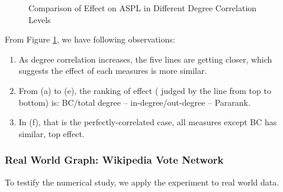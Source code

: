\documentclass{article}
\begin{document}
\begin{enumerate}
\begin{figure}[!hbtp]
\hfill
{}
\hfill
{}
\hfill
\caption{
\label{comps}%
Comparison of Effect on ASPL in Different Degree Correlation Levels}
\end{figure}

From Figure \ref{comps}, we have following observations:
\begin{enumerate}
\item As degree correlation increases, the five lines are getting closer, which suggests the effect of each measures is more similar.
\item From (a) to (e), the ranking of effect ( judged by the line from top to bottom) is: BC/total degree -- in-degree/out-degree -- Pararank.
\item In (f), that is the perfectly-correlated case, all measures except BC has similar, top effect.
\end{enumerate}

\end{enumerate}

\subsubsection{Real World Graph: Wikipedia Vote Network}
\par To testify the numerical study, we apply the experiment to real world data. 
\end{document}
